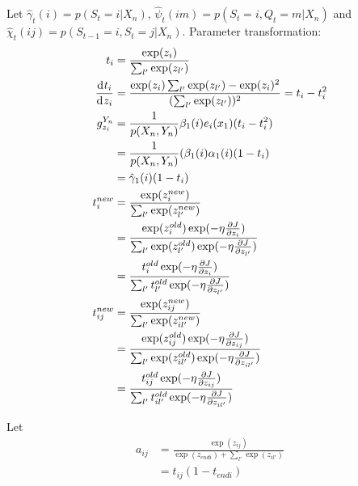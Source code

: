 Let $\hat{\gamma}_t(i) = p(S_t = i | X_n )$, $\hat{\psi}_t(im) = p(S_t = i, Q_t = m | X_n )$ and $\hat{\chi}_t(ij) = p(S_{t-1} = i, S_t = j | X_n)$. Parameter transformation:
\begin{align*}
t_i &= \frac{\exp(z_i)}{\sum_{l'}\exp(z_{l'})}\\ 
\frac{\diff t_i}{\diff z_i} &= \frac{\exp(z_i)\sum_{l'}\exp(z_{l'}) - \exp(z_i)^2}{(\sum_{l'}\exp(z_{l'}))^2} = t_i - t_i^2\\
g_{z_i}^{Y_n} &= \frac{1}{p(X_n, Y_n)}\beta_1(i)e_i(x_1)(t_i - t_i^2) \\
&= \frac{1}{p(X_n, Y_n)}(\beta_1(i)\alpha_1(i)(1 - t_i)\\
& = \hat{\gamma}_1(i)(1 - t_i)\\
t_i^{new} &= \frac{\exp(z_i^{new})}{\sum_{l'}\exp(z_{l'}^{new})}\\
&=\frac{\exp(z_i^{old})\exp(-\eta\frac{\partial J}{\partial z_i})}{\sum_{l'}\exp(z_{l'}^{old})\exp(-\eta\frac{\partial J}{\partial z_{l'}})}\\
&=\frac{t_i^{old}\exp(-\eta\frac{\partial J}{\partial z_i})}{\sum_{l'}t_{l'}^{old}\exp(-\eta\frac{\partial J}{\partial z_{l'}})}\\
t_{ij}^{new} &= \frac{\exp(z_{ij}^{new})}{\sum_{l'}\exp(z_{il'}^{new})}\\
&=\frac{\exp(z_{ij}^{old})\exp(-\eta\frac{\partial J}{\partial z_{ij}})}{\sum_{l'}\exp(z_{il'}^{old})\exp(-\eta\frac{\partial J}{\partial z_{il'}})}\\
&=\frac{t_{ij}^{old}\exp(-\eta\frac{\partial J}{\partial z_{ij}})}{\sum_{l'}t_{il'}^{old}\exp(-\eta\frac{\partial J}{\partial z_{il'}})}
\end{align*}

Let
\begin{align*}
a_{ij} &= \frac{\exp(z_{ij})}{\exp(z_{endi}) + \sum_{l'}\exp(z_{il'})}\\
&= t_{ij}(1 - t_{endi})
\end{align*}

